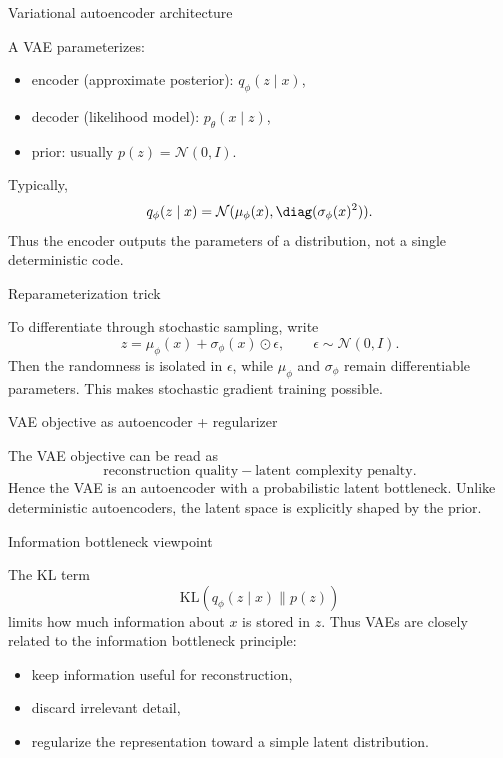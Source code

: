 \documentclass[aspectratio=169]{beamer}
\begin{document}
\begin{frame}{Variational autoencoder architecture}

A VAE parameterizes:
\begin{itemize}
\item encoder (approximate posterior): \(q_\phi(z\mid x)\),
\item decoder (likelihood model): \(p_\theta(x\mid z)\),
\item prior: usually \(p(z)=\mathcal{N}(0,I)\).
\end{itemize}
Typically,
\[
q_\phi(z\mid x)=\mathcal{N}(\mu_\phi(x),\diag(\sigma_\phi(x)^2)).
\]
Thus the encoder outputs the parameters of a distribution, not a single deterministic code.

\end{frame}

\begin{frame}{Reparameterization trick}

To differentiate through stochastic sampling, write
\[
z = \mu_\phi(x) + \sigma_\phi(x)\odot \epsilon,
\qquad
\epsilon\sim\mathcal{N}(0,I).
\]
Then the randomness is isolated in \(\epsilon\), while \(\mu_\phi\) and \(\sigma_\phi\) remain differentiable parameters.
This makes stochastic gradient training possible.

\end{frame}

\begin{frame}{VAE objective as autoencoder + regularizer}

The VAE objective can be read as
\[
\text{reconstruction quality}
-
\text{latent complexity penalty}.
\]
Hence the VAE is an autoencoder with a probabilistic latent bottleneck.
Unlike deterministic autoencoders, the latent space is explicitly shaped by the prior.

\end{frame}

\begin{frame}{Information bottleneck viewpoint}

The KL term
\[
\mathrm{KL}(q_\phi(z\mid x)\|p(z))
\]
limits how much information about \(x\) is stored in \(z\).
Thus VAEs are closely related to the information bottleneck principle:
\begin{itemize}
\item keep information useful for reconstruction,
\item discard irrelevant detail,
\item regularize the representation toward a simple latent distribution.
\end{itemize}

\end{frame}
\end{document}
